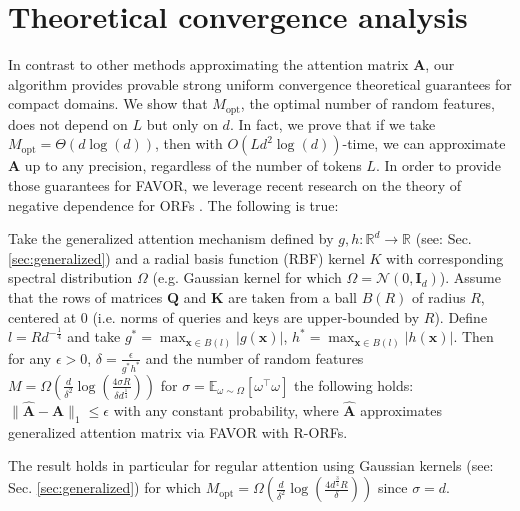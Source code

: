 
\section{Theoretical convergence analysis}
\label{sec:theory}
In contrast to other methods approximating the attention matrix $\mathbf{A}$, our algorithm provides provable strong uniform convergence theoretical guarantees for compact domains. We show that $M_{\mathrm{opt}}$, the optimal number of random features, does not depend on $L$ but only on $d$. In fact, we prove that if we take $M_{\mathrm{opt}} = \Theta(d\log(d))$, then with $O(L d^2\log(d))$-time, we can approximate $\mathbf{A}$ up to any precision, regardless of the number of tokens $L$. In order to provide those guarantees for FAVOR, we leverage recent research on the theory of negative dependence for ORFs \citep{Lin2020DemystifyingOM}.
The following is true:

\begin{theorem}
\label{uniform_convergence}
Take the generalized attention mechanism defined by $g,h:\mathbb{R}^{d} \rightarrow \mathbb{R}$ (see: Sec. \ref{sec:generalized}) and a radial basis function (RBF) kernel \citep{geom} $K$ with corresponding spectral distribution $\Omega$ (e.g. Gaussian kernel for which $\Omega=\mathcal{N}(0,\mathbf{I}_{d})$). Assume that the rows of matrices $\mathbf{Q}$ and $\mathbf{K}$ are taken from a ball $B(R)$ of radius $R$, centered at $0$ (i.e. norms of queries and keys are upper-bounded by $R$). 
Define $l=Rd^{-\frac{1}{4}}$ and take $g^{*} = \max_{\mathbf{x} \in B(l)}|g(\mathbf{x})|$, $h^{*} = \max_{\mathbf{x} \in B(l)}|h(\mathbf{x})|$.
Then for any $\epsilon>0$, $\delta=\frac{\epsilon}{g^{*}h^{*}}$
and the number of random features $M = \Omega(\frac{d}{\delta^{2}}\log(\frac{4\sigma R}{\delta d^{\frac{1}{4}}}))$ for $\sigma=\mathbb{E}_{\omega \sim \Omega}[\omega^{\top}\omega]$ the following holds:
$
\|\widehat{\mathbf{A}}-\mathbf{A}\|_{1} \leq \epsilon     
$
with any constant probability,
where $\widehat{\mathbf{A}}$ approximates generalized attention matrix via FAVOR with R-ORFs. 
\end{theorem}

The result holds in particular for regular attention using Gaussian kernels (see: Sec. \ref{sec:generalized}) for which $M_{\mathrm{opt}}=\Omega(\frac{d}{\delta^{2}}\log(\frac{4d^{\frac{3}{4}} R}{\delta}))$ since $\sigma = d$.


